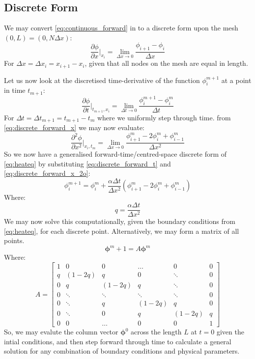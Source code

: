 \documentclass{article}[12pt]
\begin{document}
\subsection*{Discrete Form}
We may convert \eqref{eq:continuous_forward} in to a discrete form upon the mesh $(0,L) = (0,N\Delta x)$:
\begin{equation}\label{eq:discrete_forward_x}
  \frac{\partial \phi}{\partial x}\bigg\rvert_{x_i} = \lim_{\Delta x \rightarrow 0} \frac{\phi_{i+1} - \phi_i}{\Delta x}
\end{equation}
For $\Delta x = \Delta x_i = x_{i+1} - x_i$, given that all nodes on the mesh are equal in length.\par
Let us now look at the discretised time-derivative of the function $\phi_i^{m+1}$ at a point in time $t_{m+1}$:
\begin{equation}\label{eq:discrete_forward_t}
\frac{\partial \phi}{\partial t}\bigg\rvert_{t_{m+1},x_i} = \lim_{\Delta t \rightarrow 0}\frac{\phi_i^{m+1} - \phi_i^{m}}{\Delta t}
\end{equation}
For $ \Delta t = \Delta t_{m+1} = t_{m+1}  - t_{m}$ where we uniformly step through time.
from \eqref{eq:discrete_forward_x} we may now evaluate:
\begin{equation}\label{eq:discrete_forward_x_2o}
\frac{\partial^2 \phi}{\partial x^2}\bigg\rvert_{x_i,t_m} = \lim_{\Delta x \rightarrow 0} \frac{\phi_{i+1}^m - 2\phi_{i}^m + \phi_{i-1}^m}{\Delta x^2}
\end{equation}
So we now have a generalised forward-time/centred-space discrete form of \eqref{eq:heateq} by substituting \eqref{eq:discrete_forward_t} and \eqref{eq:discrete_forward_x_2o}:
\begin{equation}
\phi_i^{m+1} = \phi_i^m + \frac{\alpha\Delta t}{\Delta x^2} \left(\phi_{i+1}^m -2\phi_i^m + \phi_{i-1}^m\right)
\end{equation}
Where:
\begin{equation}
q = \frac{\alpha\Delta t}{\Delta x ^2}
\end{equation}
We may now solve this computationally, given the boundary conditions from \eqref{eq:heateq}, for each discrete point. Alternatively, we may form a matrix of all points.
\begin{equation}
\bm{\phi}^m+1 = A \bm{\phi}^{m}
\end{equation}
Where:
\begin{equation}
  A =
  \begin{bmatrix}
    1&0&0&\hdots&0&0\\
    q&(1-2q)&q&0&\ddots&0\\
    0&q&(1-2q)&q&\ddots&0\\
    0&\ddots&\ddots&\ddots&\ddots&0\\
    0&\ddots&q&(1-2q)&q&0\\
    0&\ddots&0&q&(1-2q)&q\\
    0&0&\hdots&0&0&1
  \end{bmatrix}
\end{equation}
So, we may evalute the column vector $\bm{\phi}^{0}$ across the length $L$ at $t=0$ given the intial conditions, and then step forward through time to calculate a general solution for any combination of boundary conditions and physical parameters.
\end{document}

